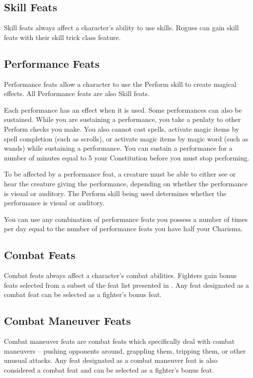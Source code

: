 \subsection{Skill Feats}
Skill feats always affect a character's ability to use skills. Rogues can gain skill feats with their skill trick class feature.

\subsection{Performance Feats}
Performance feats allow a character to use the Perform skill to create magical effects. All Performance feats are also Skill feats.

Each performance has an effect when it is used. Some performances can also be sustained. While you are sustaining a performance, you take a  penlaty to other Perform checks you make. You also cannot cast spells, activate magic items by spell completion (such as scrolls), or activate magic items by magic word (such as wands) while sustaining a performance. You can sustain a performance for a number of minutes equal to 5 \add your Constitution before you must stop performing.

To be affected by a performance feat, a creature must be able to either see or hear the creature giving the performance, depending on whether the performance is visual or auditory. The Perform skill being used determines whether the performance is visual or auditory. 

You can use any combination of performance feats you possess a number of times per day equal to the number of performance feats you have \add half your Charisma.

\subsection{Combat Feats}
Combat feats always affect a character's combat abilities. Fighters gain bonus feats selected from a subset of the feat list presented in . Any feat designated as a combat feat can be selected as a fighter's bonus feat.

\subsection{Combat Maneuver Feats}
Combat maneuver feats are combat feats which specifically deal with combat maneuvers -- pushing opponents around, grappling them, tripping them, or other unusual attacks. Any feat designated as a combat maneuver feat is also considered a combat feat and can be selected as a fighter's bonus feat.

